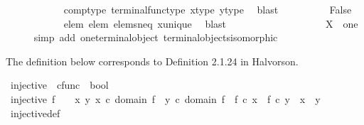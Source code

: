 \begin{isabellebody}
\ \ \ \ \ \ \ \ \ \ \isamarkupfalse%
\ comp{\isacharunderscore}{\kern0pt}type\ terminal{\isacharunderscore}{\kern0pt}func{\isacharunderscore}{\kern0pt}type\ x{\isacharunderscore}{\kern0pt}type\ y{\isacharunderscore}{\kern0pt}type\ \isamarkupfalse%
\ blast\isanewline
\ \ \ \ \ \ \ \ \isamarkupfalse%
\ False\isanewline
\ \ \ \ \ \ \ \ \ \ \isamarkupfalse%
\ elem{}\ elem{}\ elems{\isacharunderscore}{\kern0pt}neq\ x{\isacharunderscore}{\kern0pt}unique\ \isamarkupfalse%
\ blast\isanewline
\ \ \ \ \ \ \isamarkupfalse%
\isanewline
\ \ \ \ \isamarkupfalse%
\isanewline
\ \ \isamarkupfalse%
\isanewline
\ \ \isamarkupfalse%
\ \isamarkupfalse%
\ {\isachardoublequoteopen}X\ {\isasymcong}\ one{\isachardoublequoteclose}\isanewline
\ \ \ \ \isamarkupfalse%
\ {\isacharparenleft}{\kern0pt}simp\ add{\isacharcolon}{\kern0pt}\ one{\isacharunderscore}{\kern0pt}terminal{\isacharunderscore}{\kern0pt}object\ terminal{\isacharunderscore}{\kern0pt}objects{\isacharunderscore}{\kern0pt}isomorphic{\isacharparenright}{\kern0pt}\isanewline
{}\isamarkupfalse%
%
\endisatagproof
{\isafoldproof}%
%
\isadelimproof
%
\endisadelimproof
%
\isadelimdocument
%
\endisadelimdocument
%
\isatagdocument
%
\isamarkuptrue%
%
\endisatagdocument
{\isafolddocument}%
%
\isadelimdocument
%
\endisadelimdocument
%
\begin{isamarkuptext}%
The definition below corresponds to Definition 2.1.24 in Halvorson.%
\end{isamarkuptext}\isamarkuptrue%
\isamarkupfalse%
\ injective\ {\isacharcolon}{\kern0pt}{\isacharcolon}{\kern0pt}\ {\isachardoublequoteopen}cfunc\ {\isasymRightarrow}\ bool{\isachardoublequoteclose}\ \isanewline
\ {\isachardoublequoteopen}injective\ f\ \ {\isasymlongleftrightarrow}\ {\isacharparenleft}{\kern0pt}{\isasymforall}\ x\ y{\isachardot}{\kern0pt}\ {\isacharparenleft}{\kern0pt}x\ {\isasymin}\isactrlsub c\ domain\ f\ {\isasymand}\ y\ {\isasymin}\isactrlsub c\ domain\ f\ {\isasymand}\ f\ {\isasymcirc}\isactrlsub c\ x\ {\isacharequal}{\kern0pt}\ f\ {\isasymcirc}\isactrlsub c\ y{\isacharparenright}{\kern0pt}\ {\isasymlongrightarrow}\ x\ {\isacharequal}{\kern0pt}\ y{\isacharparenright}{\kern0pt}{\isachardoublequoteclose}\isanewline
\isanewline
{}\isamarkupfalse%
\ injective{\isacharunderscore}{\kern0pt}def{}{\isacharcolon}{\kern0pt}\isanewline

\end{isabellebody}
